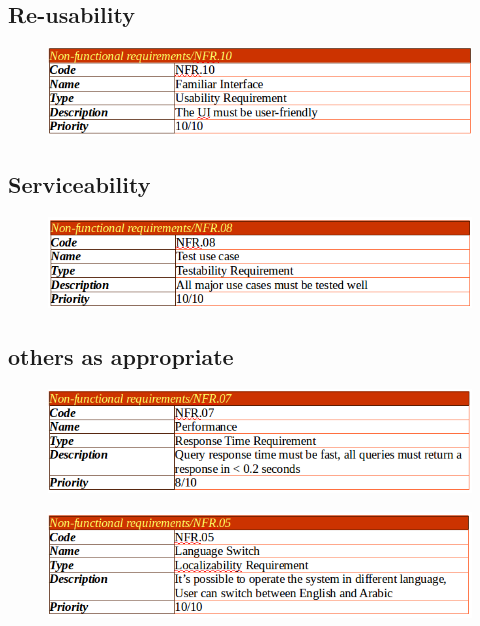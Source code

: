 \documentclass[]{article}
\begin{document}
\subsection {Re-usability}

\begin{figure}[H]
\centering
\includegraphics[scale=0.4]{./nonf/06}
\end{figure}

\subsection {Serviceability}

\begin{figure}[H]
\centering
\includegraphics[scale=0.4]{./nonf/07}
\end{figure}

\subsection {others as appropriate}

\begin{figure}[H]
\centering
\includegraphics[scale=0.4]{./nonf/08}
\end{figure}

\begin{figure}[H]
\centering
\includegraphics[scale=0.4]{./nonf/09}
\end{figure}
\end{document}
